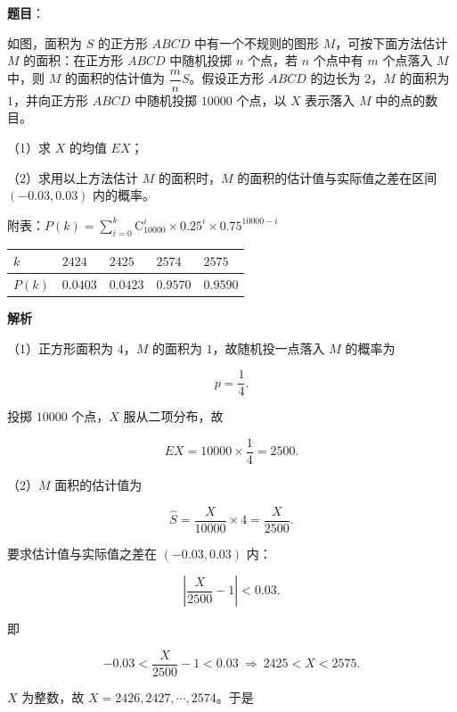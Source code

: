 \begin{answer}

\textbf{题目}：

如图，面积为 $S$ 的正方形 $ABCD$ 中有一个不规则的图形 $M$，可按下面方法估计 $M$ 的面积：在正方形 $ABCD$ 中随机投掷 $n$ 个点，若 $n$ 个点中有 $m$ 个点落入 $M$ 中，则 $M$ 的面积的估计值为 $\dfrac mnS$。假设正方形 $ABCD$ 的边长为 $2$，$M$ 的面积为 $1$，并向正方形 $ABCD$ 中随机投掷 $10000$ 个点，以 $X$ 表示落入 $M$ 中的点的数目。

（1）求 $X$ 的均值 $EX$；

（2）求用以上方法估计 $M$ 的面积时，$M$ 的面积的估计值与实际值之差在区间 $(-0.03,\allowbreak 0.03)$ 内的概率。

附表：$P(k)=\sum\limits_{i=0}^{k}\mathrm C_{10000}^i\times0.25^i\times0.75^{10000-i}$

\begin{center}
\begin{tabular}{lllll}
\toprule
$k$ & $2424$ & $2425$ & $2574$ & $2575$ \\
\midrule
$P(k)$ & $0.0403$ & $0.0423$ & $0.9570$ & $0.9590$ \\
\bottomrule
\end{tabular}
\end{center}
\nopagebreak[4]
\begin{center}\end{center}
\nopagebreak[4]
\textbf{解析}

（1）正方形面积为 $4$，$M$ 的面积为 $1$，故随机投一点落入 $M$ 的概率为

\nopagebreak[4]
\[p=\frac14.\]

投掷 $10000$ 个点，$X$ 服从二项分布，故

\nopagebreak[4]
\[EX=10000\times\frac14=2500.\]

（2）$M$ 面积的估计值为

\nopagebreak[4]
\[\hat S=\frac{X}{10000}\times4=\frac{X}{2500}.\]

要求估计值与实际值之差在 $(-0.03,0.03)$ 内：

\nopagebreak[4]
\[\left|\frac{X}{2500}-1\right|<0.03.\]

即

\nopagebreak[4]
\[-0.03<\frac{X}{2500}-1<0.03\ \Rightarrow\ 2425<X<2575.\]

$X$ 为整数，故 $X=2426,2427,\cdots,2574$。于是


\end{answer}
